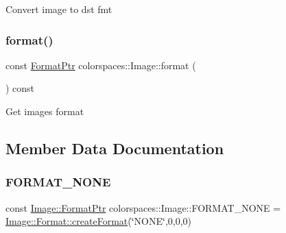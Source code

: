 Convert image to dst fmt \mbox{\label{classcolorspaces_1_1_image_a1bd416764e9349d73ab57154c0eebcc7}} 
\subsubsection{\texorpdfstring{format()}{format()}}
{\footnotesize\ttfamily const \hyperlink{classcolorspaces_1_1_image_ab3978cc7acc2b5e855f8c715f09667d1}{Format\+Ptr} colorspaces\+::\+Image\+::format (\begin{DoxyParamCaption}{ }\end{DoxyParamCaption}) const\hspace{0.3cm}{\ttfamily [inline]}}

Get image\textquotesingle{}s format 

\subsection{Member Data Documentation}
\mbox{\label{classcolorspaces_1_1_image_a53b533100b5fd24fae3617f271c73271}} 
\subsubsection{\texorpdfstring{F\+O\+R\+M\+A\+T\+\_\+\+N\+O\+NE}{FORMAT\_NONE}}
{\footnotesize\ttfamily const \hyperlink{classcolorspaces_1_1_image_ab3978cc7acc2b5e855f8c715f09667d1}{Image\+::\+Format\+Ptr} colorspaces\+::\+Image\+::\+F\+O\+R\+M\+A\+T\+\_\+\+N\+O\+NE = \hyperlink{classcolorspaces_1_1_image_1_1_format_ae79208f237b72cf596331ebcec2ff58b}{Image\+::\+Format\+::create\+Format}(\char`\"{}N\+O\+NE\char`\"{},0,0,0)\hspace{0.3cm}{\ttfamily [static]}}

\mbox{\label{classcolorspaces_1_1_image_a99a05ebd37f61215b2c3042ecaefdbfc}} 
